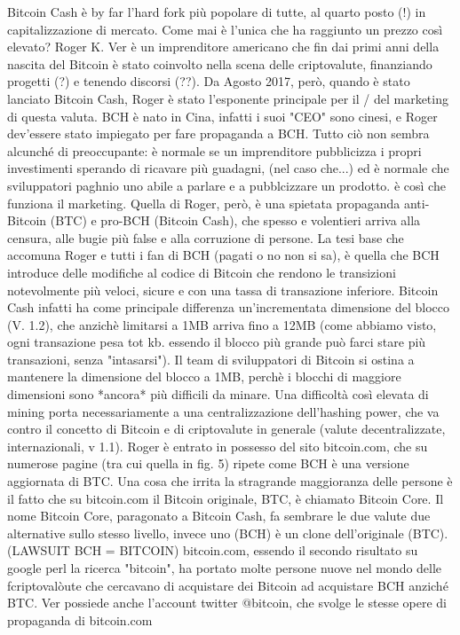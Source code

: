 \documentclass {article}
\begin{document}
Bitcoin Cash è by far l'hard fork più popolare di tutte, al quarto posto (!) in capitalizzazione di mercato. Come mai è l'unica che ha raggiunto un prezzo così elevato?
Roger K. Ver è un imprenditore americano che fin dai primi anni della nascita del Bitcoin è stato coinvolto nella scena delle criptovalute, finanziando progetti (?) e tenendo discorsi (??).
Da Agosto 2017, però, quando è stato lanciato Bitcoin Cash, Roger è stato l'esponente principale per il / del marketing di questa valuta. BCH è nato in Cina, infatti i suoi "CEO" sono cinesi, e Roger dev'essere stato impiegato per fare propaganda a BCH.
Tutto ciò non sembra alcunché di preoccupante: è normale se un imprenditore pubblicizza i propri investimenti sperando di ricavare più guadagni, (nel caso che...) ed è normale che sviluppatori paghnio uno abile a parlare e a pubblcizzare un prodotto. è così che funziona il marketing.
Quella di Roger, però, è una spietata propaganda anti-Bitcoin (BTC) e pro-BCH (Bitcoin Cash), che spesso e volentieri arriva alla censura, alle bugie più false e alla corruzione di persone.
La tesi base che accomuna Roger e tutti i fan di BCH (pagati o no non si sa), è quella che BCH introduce delle modifiche al codice di Bitcoin che rendono le transizioni notevolmente più veloci, sicure e con una tassa di transazione inferiore. Bitcoin Cash infatti ha come principale differenza un'incrementata dimensione del blocco (V. 1.2), che anzichè limitarsi a 1MB arriva fino a 12MB (come abbiamo visto, ogni transazione pesa tot kb. essendo il blocco più grande può farci stare più transazioni, senza "intasarsi").
Il team di sviluppatori di Bitcoin si ostina a mantenere la dimensione del blocco a 1MB, perchè i blocchi di maggiore dimensioni sono *ancora* più difficili da minare. Una difficoltà così elevata di mining porta necessariamente a una centralizzazione dell'hashing power, che va contro il concetto di Bitcoin e di criptovalute in generale (valute decentralizzate, internazionali, v 1.1).
Roger è entrato in possesso del sito bitcoin.com, che su numerose pagine (tra cui quella in fig. 5) ripete come BCH è una versione aggiornata di BTC. Una cosa che irrita la stragrande maggioranza delle persone è il fatto che su bitcoin.com il Bitcoin originale, BTC, è chiamato Bitcoin Core. Il nome Bitcoin Core, paragonato a Bitcoin Cash, fa sembrare le due valute due alternative sullo stesso livello, invece uno (BCH) è un clone dell'originale (BTC). (LAWSUIT BCH = BITCOIN)
bitcoin.com, essendo il secondo risultato su google perl la ricerca "bitcoin", ha portato molte persone nuove nel mondo delle fcriptovalòute che cercavano di acquistare dei Bitcoin ad acquistare BCH anziché BTC.
Ver possiede anche l'account twitter @bitcoin, che svolge le stesse opere di propaganda di bitcoin.com
\end{document}
